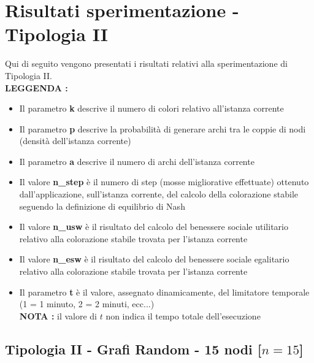 \section{Risultati sperimentazione - Tipologia II}
\justify
Qui di seguito vengono presentati i risultati relativi alla sperimentazione di Tipologia II.\\

\textbf{LEGGENDA : }

\begin{itemize}
	\item Il parametro \textbf{k} descrive il numero di colori relativo all'istanza corrente
	\item Il parametro \textbf{p} descrive la probabilità di generare archi tra le coppie di nodi (densità dell'istanza corrente)
	\item Il parametro \textbf{a} descrive il numero di archi dell'istanza corrente
	\item Il valore \textbf{n\_step} è il numero di step (mosse migliorative effettuate) ottenuto dall'applicazione, sull'istanza corrente, del calcolo della colorazione stabile seguendo la definizione di equilibrio di Nash
	\item Il valore \textbf{n\_usw} è il risultato del calcolo del benessere sociale utilitario relativo alla colorazione stabile trovata per l'istanza corrente
	\item Il valore \textbf{n\_esw} è il risultato del calcolo del benessere sociale egalitario relativo alla colorazione stabile trovata per l'istanza corrente
	\item Il parametro \textbf{t} è il valore, assegnato dinamicamente, del limitatore temporale (1 = 1 minuto, 2 = 2 minuti, ecc...)\\
	\textbf{NOTA :} il valore di $t$ non indica il tempo totale dell'esecuzione
\end{itemize}

\subsection{Tipologia II - Grafi Random - 15 nodi [$n=15$]}


